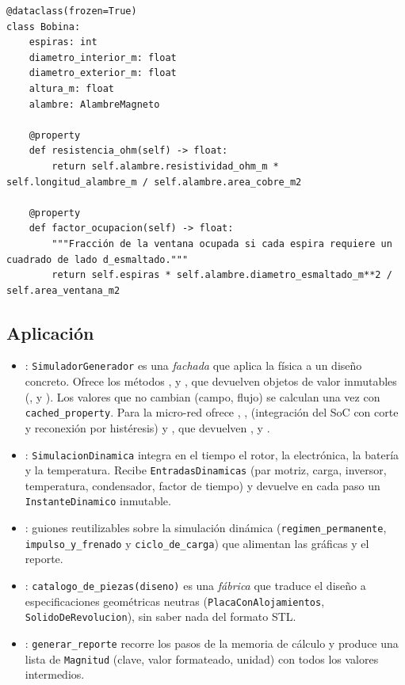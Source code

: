 \documentclass[11pt]{article}
\begin{document}
\begin{lstlisting}[style=python]
@dataclass(frozen=True)
class Bobina:
    espiras: int
    diametro_interior_m: float
    diametro_exterior_m: float
    altura_m: float
    alambre: AlambreMagneto

    @property
    def resistencia_ohm(self) -> float:
        return self.alambre.resistividad_ohm_m * self.longitud_alambre_m / self.alambre.area_cobre_m2

    @property
    def factor_ocupacion(self) -> float:
        """Fracción de la ventana ocupada si cada espira requiere un cuadrado de lado d_esmaltado."""
        return self.espiras * self.alambre.diametro_esmaltado_m**2 / self.area_ventana_m2
\end{lstlisting}

\subsection{Aplicación}
\begin{itemize}
  \item {}: \texttt{SimuladorGenerador} es una \emph{fachada} que aplica la física a un
        diseño concreto. Ofrece los métodos ,  y
        , que devuelven objetos de valor inmutables
        (,  y ). Los valores que no cambian
        (campo, flujo) se calculan una vez con \texttt{cached\_property}. Para la micro-red ofrece
        , ,
         (integración del SoC con corte y reconexión por histéresis) y
        , que devuelven , 
        y .
  \item {}: \texttt{SimulacionDinamica} integra en el tiempo el rotor, la electrónica,
        la batería y la temperatura. Recibe \texttt{EntradasDinamicas} (par motriz, carga, inversor, temperatura,
        condensador, factor de tiempo) y devuelve en cada paso un \texttt{InstanteDinamico} inmutable.
  \item {}: guiones reutilizables sobre la simulación dinámica
        (\texttt{regimen\_permanente}, \texttt{impulso\_y\_frenado} y \texttt{ciclo\_de\_carga}) que alimentan las
        gráficas y el reporte.
  \item {}: \texttt{catalogo\_de\_piezas(diseno)} es una \emph{fábrica} que traduce el diseño a
        especificaciones geométricas neutras (\texttt{PlacaConAlojamientos}, \texttt{SolidoDeRevolucion}), sin
        saber nada del formato STL.
  \item {}: \texttt{generar\_reporte} recorre los pasos de la memoria de cálculo y produce una
        lista de \texttt{Magnitud} (clave, valor formateado, unidad) con todos los valores intermedios.
\end{itemize}
\end{document}
